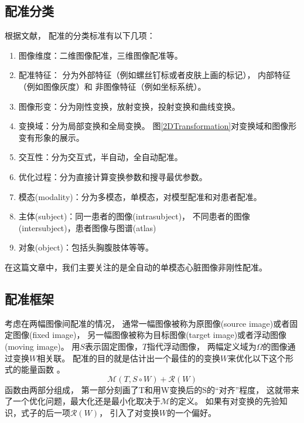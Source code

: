 \subsection{配准分类}
根据文献\cite{RegistrationSurvey,RegistrationSurveyNew}，
配准的分类标准有以下几项：
\begin{enumerate}
  \item 图像维度：二维图像配准，三维图像配准等。
  \item 配准特征：
    分为外部特征（例如螺丝钉标或者皮肤上画的标记），
    内部特征（例如图像灰度）和
    非图像特征（例如坐标系统）。
  \item 图像形变：分为刚性变换，放射变换，投射变换和曲线变换。
  \item 变换域：分为局部变换和全局变换。
    图\ref{2DTransformation}对变换域和图像形变有形象的展示。
  \item 交互性：分为交互式，半自动，全自动配准。
  \item 优化过程：分为直接计算变换参数和搜寻最优参数。
  \item 模态(modality)：分为多模态，单模态，对模型配准和对患者配准。
  \item 主体(subject)：同一患者的图像(intrasubject)，
    不同患者的图像(intersubject)，患者图像与图谱(atlas)
  \item 对象(object)：包括头胸腹肢体等等。
\end{enumerate}

在这篇文章中，我们主要关注的是全自动的单模态心脏图像非刚性配准。

\subsection{配准框架}
考虑在两幅图像间配准的情况，
通常一幅图像被称为原图像(source image)或者固定图像(fixed image)，
另一幅图像被称为目标图像(target image)或者浮动图像(moving image)。
用$S$表示固定图像，$T$指代浮动图像，
两幅定义域为$\Omega$的图像通过变换$W$相关联。
配准的目的就是估计出一个最佳的的变换$W$来优化以下这个形式的能量函数
。
$$\mathcal{M}(T,S\circ W)+\mathcal{R}(W)$$
函数由两部分组成，
第一部分刻画了T和用W变换后的S的``对齐''程度，
这就带来了一个优化问题，最大化还是最小化取决于$\mathcal{M}$的定义。
如果有对变换的先验知识，式子的后一项$\mathcal{R}(W)$，
引入了对变换$W$的一个偏好。


